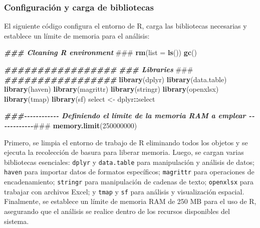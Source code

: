 \documentclass[
  12pt,
]{book}
\newenvironment{Shaded}{\begin{snugshade}}{\end{snugshade}}
\newcommand{\AlertTok}[1]{\textcolor[rgb]{0.94,0.16,0.16}{#1}}
\newcommand{\AttributeTok}[1]{\textcolor[rgb]{0.13,0.29,0.53}{#1}}
\newcommand{\DecValTok}[1]{\textcolor[rgb]{0.00,0.00,0.81}{#1}}
\newcommand{\DocumentationTok}[1]{\textcolor[rgb]{0.56,0.35,0.01}{\textbf{\textit{#1}}}}
\newcommand{\FunctionTok}[1]{\textcolor[rgb]{0.13,0.29,0.53}{\textbf{#1}}}
\newcommand{\NormalTok}[1]{#1}
\newcommand{\OtherTok}[1]{\textcolor[rgb]{0.56,0.35,0.01}{#1}}
\newcommand{\SpecialCharTok}[1]{\textcolor[rgb]{0.81,0.36,0.00}{\textbf{#1}}}
\begin{document}
\hypertarget{configuraciuxf3n-y-carga-de-bibliotecas}{%
\subsubsection*{Configuración y carga de bibliotecas}\label{configuraciuxf3n-y-carga-de-bibliotecas}}

El siguiente código configura el entorno de R, carga las bibliotecas necesarias y establece un límite de memoria para el análisis:

\begin{Shaded}
\begin{Highlighting}[]
\DocumentationTok{\#\#\# Cleaning R environment }\AlertTok{\#\#\#}
\FunctionTok{rm}\NormalTok{(}\AttributeTok{list =} \FunctionTok{ls}\NormalTok{())}
\FunctionTok{gc}\NormalTok{()}

\DocumentationTok{\#\#\#\#\#\#\#\#\#\#\#\#\#\#\#\#\#}
\DocumentationTok{\#\#\# Libraries }\AlertTok{\#\#\#}
\DocumentationTok{\#\#\#\#\#\#\#\#\#\#\#\#\#\#\#\#\#}
\FunctionTok{library}\NormalTok{(dplyr)}
\FunctionTok{library}\NormalTok{(data.table)}
\FunctionTok{library}\NormalTok{(haven)}
\FunctionTok{library}\NormalTok{(magrittr)}
\FunctionTok{library}\NormalTok{(stringr)}
\FunctionTok{library}\NormalTok{(openxlsx)}
\FunctionTok{library}\NormalTok{(tmap)}
\FunctionTok{library}\NormalTok{(sf)}
\NormalTok{select }\OtherTok{\textless{}{-}}\NormalTok{ dplyr}\SpecialCharTok{::}\NormalTok{select}

\DocumentationTok{\#\#\#{-}{-}{-}{-}{-}{-}{-}{-}{-}{-}{-}{-} Definiendo el límite de la memoria RAM a emplear {-}{-}{-}{-}{-}{-}{-}{-}{-}{-}{-}{-}}\AlertTok{\#\#\#}
\FunctionTok{memory.limit}\NormalTok{(}\DecValTok{250000000}\NormalTok{)}
\end{Highlighting}
\end{Shaded}

Primero, se limpia el entorno de trabajo de R eliminando todos los objetos y se ejecuta la recolección de basura para liberar memoria. Luego, se cargan varias bibliotecas esenciales: \texttt{dplyr} y \texttt{data.table} para manipulación y análisis de datos; \texttt{haven} para importar datos de formatos específicos; \texttt{magrittr} para operaciones de encadenamiento; \texttt{stringr} para manipulación de cadenas de texto; \texttt{openxlsx} para trabajar con archivos Excel; y \texttt{tmap} y \texttt{sf} para análisis y visualización espacial. Finalmente, se establece un límite de memoria RAM de 250 MB para el uso de R, asegurando que el análisis se realice dentro de los recursos disponibles del sistema.
\end{document}
